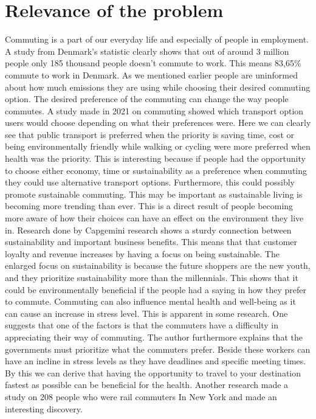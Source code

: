 \section{Relevance of the problem}
Commuting is a part of our everyday life and especially of people in employment.
A study from Denmark’s statistic clearly shows that out of around 3 million people
only 185 thousand people doesn’t commute to work.
This means 83,65\% commute to work in Denmark.
As we mentioned earlier people are uninformed about how much emissions
they are using while choosing their desired commuting option.
The desired preference of the commuting can change the way people commutes.
A study made in 2021 on commuting showed which transport option users would
choose depending on what their preferences were.
Here we can clearly see that public transport is preferred when the priority is
saving time, cost or being environmentally friendly while walking
or cycling were more preferred when health was the priority.
This is interesting because if people had the opportunity to choose either economy,
time or sustainability as a preference when commuting they could use alternative transport options.
Furthermore, this could possibly promote sustainable commuting. This may be important as sustainable living
is becoming more trending than ever.
This is a direct result of people becoming more aware of how their choices
can have an effect on the environment they live in.
Research done by Capgemini research shows a sturdy connection between sustainability and important business benefits.
This means that that customer loyalty and revenue increases by having a focus on being sustainable.
The enlarged focus on sustainability is because the future shoppers
are the new youth, and they prioritize sustainability more than the millennials.
This shows that it could be environmentally beneficial if the people had a saying in how they prefer to commute.
Commuting can also influence mental health and well-being as it can cause an increase in stress level.
This is apparent in some research. One suggests that one of the factors
is that the commuters have a difficulty in appreciating their way of commuting.
The author furthermore explains that the governments must prioritize what the commuters prefer.
Beside these workers can have an incline in stress levels as they have deadlines and specific meeting times.
By this we can derive that having the opportunity to travel to
your destination fastest as possible can be beneficial for the health.
Another research made a study on 208 people who were rail commuters In New York and made an interesting discovery.
